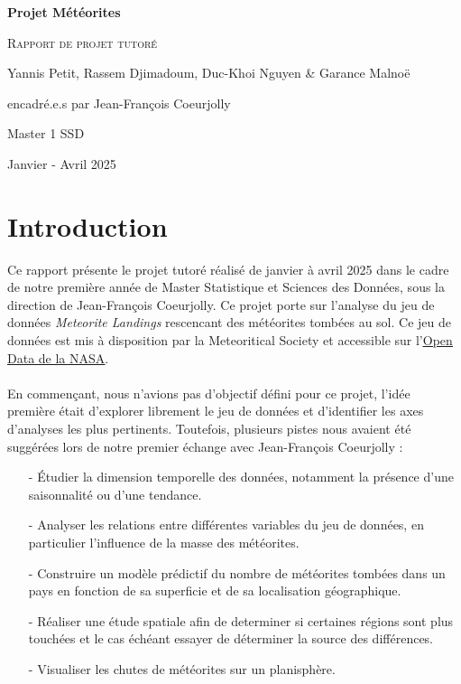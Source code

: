 \documentclass[12pt]{article}
\begin{document}
\begin{titlepage}
    \centering   
    {\huge\bfseries Projet Météorites\par}
    \vspace{1cm}
    {\scshape\Large Rapport de projet tutoré\par}
    \vspace{1.5cm}
    {\large Yannis Petit, Rassem Djimadoum, Duc-Khoi Nguyen \& Garance Malnoë\par
    encadré.e.s par Jean-François Coeurjolly\par}
    \vspace{0.5cm}
    {\large Master 1 SSD\par}
    \vspace{0.5cm}
    {\large Janvier - Avril 2025\par}
    \vspace{3cm}
\end{titlepage}
\tableofcontents
\clearpage
{}
\section{Introduction}
Ce rapport présente le projet tutoré réalisé de janvier à avril 2025 dans le cadre de notre première année de Master Statistique et Sciences des Données, sous la direction de Jean-François Coeurjolly. Ce projet porte sur l'analyse du jeu de données \textit{Meteorite Landings} rescencant des météorites tombées au sol. Ce jeu de données est mis à disposition par la Meteoritical Society et accessible sur  l'\href{https://data.nasa.gov/Space-Science/Meteorite-Landings/gh4g-9sfh/about_data}{\underline{Open Data de la NASA}}.\\
\\
En commençant, nous n'avions pas d'objectif défini pour ce projet, l'idée première était d'explorer librement le jeu de données et d'identifier les axes d'analyses les plus pertinents. Toutefois, plusieurs pistes nous avaient été suggérées lors de notre premier échange avec Jean-François Coeurjolly :\\
\begin{itemize}
	\item[-] Étudier la dimension temporelle des données, notamment la présence d'une saisonnalité ou d'une tendance.\\
	\item[-] Analyser les relations entre différentes variables du jeu de données, en particulier l'influence de la masse des 		météorites.\\
	\item[-] Construire un modèle prédictif du nombre de météorites tombées dans un pays en fonction de sa superficie et de sa localisation géographique.\\
	\item[-] Réaliser une étude spatiale afin de determiner si certaines régions sont plus touchées et le cas échéant essayer de déterminer la source des différences.\\
	\item[-] Visualiser les chutes de météorites sur un planisphère.\\
\end{itemize}
\end{document}

